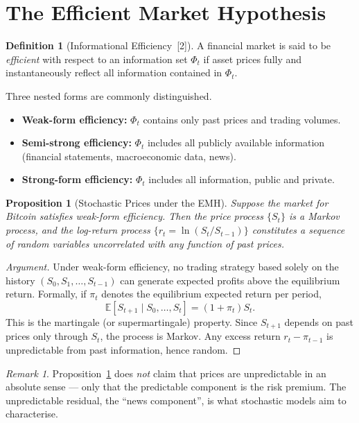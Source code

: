 \documentclass[12pt, a4paper, oneside]{report}
\theoremstyle{plain}
\newtheorem{proposition}[theorem]{Proposition}
\theoremstyle{definition}
\newtheorem{definition}[theorem]{Definition}
\theoremstyle{remark}
\newtheorem{remark}[theorem]{Remark}
\newcommand{\E}{\mathbb{E}}
\begin{document}
\section{The Efficient Market Hypothesis}

\begin{definition}[Informational Efficiency~{[2]}]
A financial market is said to be \emph{efficient} with respect to an information
set $\Phi_t$ if asset prices fully and instantaneously reflect all information
contained in $\Phi_t$.
\end{definition}

Three nested forms are commonly distinguished.

\begin{itemize}[leftmargin=1.25cm]
  \item \textbf{Weak-form efficiency:} $\Phi_t$ contains only past prices and
    trading volumes.
  \item \textbf{Semi-strong efficiency:} $\Phi_t$ includes all publicly available
    information (financial statements, macroeconomic data, news).
  \item \textbf{Strong-form efficiency:} $\Phi_t$ includes all information, public
    and private.
\end{itemize}

\begin{proposition}[Stochastic Prices under the EMH]
\label{prop:emh}
Suppose the market for Bitcoin satisfies weak-form efficiency.  Then the price
process $\{S_t\}$ is a Markov process, and the log-return process
$\{r_t = \ln(S_t / S_{t-1})\}$ constitutes a sequence of random variables
uncorrelated with any function of past prices.
\end{proposition}

\begin{proof}[Argument]
Under weak-form efficiency, no trading strategy based solely on the history
$(S_0, S_1, \ldots, S_{t-1})$ can generate expected profits above the equilibrium
return.  Formally, if $\pi_t$ denotes the equilibrium expected return per period,
\[
  \E[S_{t+1} \mid S_0, \ldots, S_t] = (1 + \pi_t) S_t.
\]
This is the martingale (or supermartingale) property.  Since $S_{t+1}$ depends on
past prices only through $S_t$, the process is Markov.  Any excess return
$r_t - \pi_{t-1}$ is unpredictable from past information, hence random.
\end{proof}

\begin{remark}
Proposition~\ref{prop:emh} does \emph{not} claim that prices are unpredictable in
an absolute sense --- only that the predictable component is the risk premium.  The
unpredictable residual, the ``news component'', is what stochastic models aim to
characterise.
\end{remark}
\end{document}
